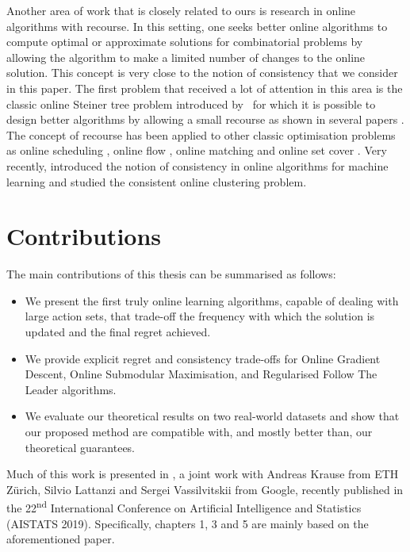 Another area of work that is closely related to ours is research in online algorithms with recourse. In this setting, one seeks better online algorithms to compute optimal or approximate solutions for combinatorial problems by allowing the algorithm to make a limited number of changes to the online solution. 
This concept is very close to the notion of consistency that we consider in this paper. The first problem that received a lot of attention in this area is the classic online Steiner tree problem introduced by~\cite{DBLP:journals/siamdm/ImaseW91} for which it is possible to design better algorithms by allowing a small recourse as shown in several papers \citep{DBLP:journals/siamcomp/GuG016, DBLP:conf/soda/GuptaK14, DBLP:conf/stoc/LackiOPSZ15, DBLP:journals/siamcomp/MegowSVW16}. The concept of recourse has been applied to other classic optimisation problems as online scheduling \citep{DBLP:journals/algorithmica/AndrewsGZ99, DBLP:journals/algorithmica/EpsteinL14, DBLP:journals/algorithmica/PhillipsW98, DBLP:journals/mor/SandersSS09, DBLP:conf/esa/SkutellaV10}, online flow \citep{DBLP:conf/soda/GuptaKS14, DBLP:journals/jal/Westbrook00}, online matching \cite{DBLP:conf/soda/BernsteinHR18} and online set cover \citep{DBLP:conf/stoc/GuptaK0P17}. Very recently, \cite{DBLP:conf/icml/LattanziV17} introduced the notion of consistency in online algorithms for machine learning and studied the consistent online clustering problem.

\section{Contributions}
The main contributions of this thesis can be summarised as follows:
\begin{itemize}
    \item We present the first truly online learning algorithms, capable of dealing with large action sets, that trade-off the frequency with which the solution is updated and the final regret achieved.
    \item We provide explicit regret and consistency trade-offs for Online Gradient Descent, Online Submodular Maximisation, and Regularised Follow The Leader algorithms.
    \item We evaluate our theoretical results on two real-world datasets and show that our proposed method are compatible with, and mostly better than, our theoretical guarantees.
\end{itemize}

Much of this work is presented in \citet{karimi2019}, a joint work with Andreas Krause from ETH Z\"urich, Silvio Lattanzi and Sergei Vassilvitskii from Google, recently published in the 22\textsuperscript{nd} International Conference on Artificial Intelligence and Statistics (AISTATS 2019). Specifically, chapters 1, 3 and 5 are mainly based on the aforementioned paper.


